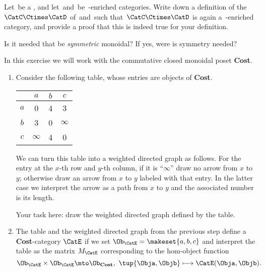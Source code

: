 
\begin{gradedexercise}
    \label{ex:ProductOfEnrichedCats}
    Let~\CatV be a , and let~\CatC and~\CatD be~\CatV-enriched categories.
    Write down a definition of the ~$\CatC \Ctimes \CatD$ of~\CatC and~\CatD such that~$\CatC \Ctimes \CatD$ is again a~\CatV-enriched category, and provide a proof that this is indeed true for your definition.

    Is it needed that \CatV be \emph{symmetric} monoidal?
    If yes, were is symmetry needed?
\end{gradedexercise}

\begin{gradedexercise}
    \label{ex:HwkCostMatrices}

    In this exercise we will work with the commutative closed monoidal poset \textbf{Cost}.

    \begin{enumerate}
        \item Consider the following table, whose entries are objects of \textbf{Cost}.

              \begin{center}
                  \begin{tabular}{c|ccc}
                          & $a$      & $b$ & $c$ \\
                      \hline
                      $a$ & 0        & 4   & 3 \\
                      $b$ & 3        & 0   & $\infty$ \\
                      $c$ & $\infty$ & 4   & 0
                  \end{tabular}
              \end{center}

              We can turn this table into a weighted directed graph as follows.
              For the entry at the $x$-th row and $y$-th column, if it is ``$\infty$'' draw no arrow from $x$ to $y$; otherwise draw an arrow from $x$ to $y$ labeled with that entry.
              In the latter case we interpret the arrow as a path from $x$ to $y$ and the associated number is its length.

              Your task here: draw the weighted directed graph defined by the table.

        \item The table and the weighted directed graph from the previous step define a \textbf{Cost}-category $\CatE$ if we set $\Ob_\CatE = \makeset{a, b, c}$ and interpret the table as the matrix $M_\CatE$ corresponding to the hom-object function
              \begin{equation}
                  \Ob_\CatE \times \Ob_\CatE \mto \Ob_\textbf{Cost}, \ \tup{\Obja, \Objb} \longmapsto \CatE(\Obja, \Objb).
              \end{equation}


\end{enumerate}
\end{gradedexercise}
